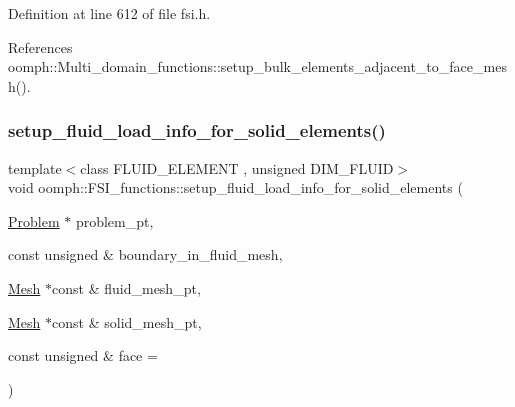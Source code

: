 Definition at line 612 of file fsi.\+h.



References oomph\+::\+Multi\+\_\+domain\+\_\+functions\+::setup\+\_\+bulk\+\_\+elements\+\_\+adjacent\+\_\+to\+\_\+face\+\_\+mesh().

\mbox{\label{namespaceoomph_1_1FSI__functions_adccd22c19d99eabffd72f7671df49598}} 
\subsubsection{\texorpdfstring{setup\+\_\+fluid\+\_\+load\+\_\+info\+\_\+for\+\_\+solid\+\_\+elements()}{setup\_fluid\_load\_info\_for\_solid\_elements()}\hspace{0.1cm}{\footnotesize\ttfamily [2/2]}}
{\footnotesize\ttfamily template$<$class F\+L\+U\+I\+D\+\_\+\+E\+L\+E\+M\+E\+NT , unsigned D\+I\+M\+\_\+\+F\+L\+U\+ID$>$ \\
void oomph\+::\+F\+S\+I\+\_\+functions\+::setup\+\_\+fluid\+\_\+load\+\_\+info\+\_\+for\+\_\+solid\+\_\+elements (\begin{DoxyParamCaption}\item[{\hyperlink{classoomph_1_1Problem}{Problem} $\ast$}]{problem\+\_\+pt,  }\item[{const unsigned \&}]{boundary\+\_\+in\+\_\+fluid\+\_\+mesh,  }\item[{\hyperlink{classoomph_1_1Mesh}{Mesh} $\ast$const \&}]{fluid\+\_\+mesh\+\_\+pt,  }\item[{\hyperlink{classoomph_1_1Mesh}{Mesh} $\ast$const \&}]{solid\+\_\+mesh\+\_\+pt,  }\item[{const unsigned \&}]{face = {} }\end{DoxyParamCaption})}



